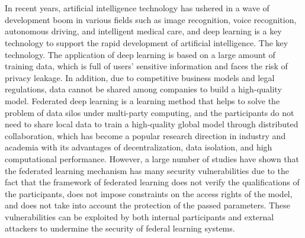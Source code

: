 \newpage
\vspace{-1cm}
\chapter*{}
In recent years, artificial intelligence technology has ushered in a wave of development boom in various fields such as image recognition, voice recognition, autonomous driving, and intelligent medical care, and deep learning is a key technology to support the rapid development of artificial intelligence.
The key technology. The application of deep learning is based on a large amount of training data, which is full of users' sensitive information and faces the risk of privacy leakage. In addition, due to competitive business models and legal regulations, data cannot be shared among companies to build a high-quality model. Federated deep learning is a learning method that helps to solve the problem of data silos under multi-party computing, and the participants do not need to share local data to train a high-quality global model through distributed collaboration, which has become a popular research direction in industry and academia with its advantages of decentralization, data isolation, and high computational performance. However, a large number of studies have shown that the federated learning mechanism has many security vulnerabilities due to the fact that the framework of federated learning does not verify the qualifications of the participants, does not impose constraints on the access rights of the model, and does not take into account the protection of the passed parameters. These vulnerabilities can be exploited by both internal participants and external attackers to undermine the security of federal learning systems.

